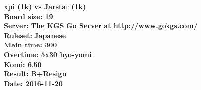 \documentclass{article}
\begin{document}
\begin{titlepage}
    \null
    \vfill
    \begin{center}
        \textbf{xpi (1k) vs Jarstar (1k)}\\
        \textbf{Board size: 19}\\
        \textbf{Server: The KGS Go Server at http://www.gokgs.com/}\\
        \textbf{Ruleset: Japanese}\\
        \textbf{Main time: 300}\\
        \textbf{Overtime: 5x30 byo-yomi}\\
        \textbf{Komi: 6.50}\\
        \textbf{Result: B+Resign}\\
        \textbf{Date: 2016-11-20}
    \end{center}
    \vfill
\end{titlepage}
\newpage
\tableofcontents
\newpage
\end{document}

